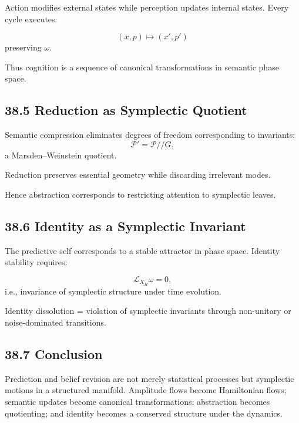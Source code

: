 \documentclass[12pt,letterpaper]{article}
\theoremstyle{remark}
\begin{document}
Action modifies external states while perception updates internal states.  
Every cycle executes:

\[
(x,p) \mapsto (x',p')
\]
preserving $\omega$.

Thus cognition is a sequence of canonical transformations in semantic phase space.

\subsection{38.5 Reduction as Symplectic Quotient}

Semantic compression eliminates degrees of freedom corresponding to invariants:
\[
\mathcal{P}' = \mathcal{P} /\!/ G,
\]
a Marsden–Weinstein quotient.

Reduction preserves essential geometry while discarding irrelevant modes.

Hence abstraction corresponds to restricting attention to symplectic leaves.

\subsection{38.6 Identity as a Symplectic Invariant}

The predictive self corresponds to a stable attractor in phase space.  
Identity stability requires:

\[
\mathcal{L}_{X_H}\omega = 0,
\]
i.e., invariance of symplectic structure under time evolution.

Identity dissolution = violation of symplectic invariants through non-unitary or noise-dominated transitions.

\subsection{38.7 Conclusion}

Prediction and belief revision are not merely statistical processes but symplectic motions in a structured manifold. Amplitude flows become Hamiltonian flows; semantic updates become canonical transformations; abstraction becomes quotienting; and identity becomes a conserved structure under the dynamics.
\end{document}
